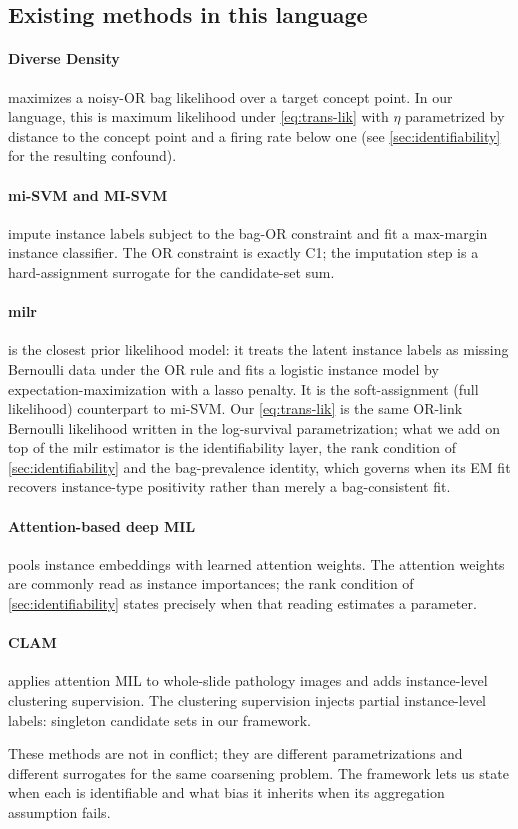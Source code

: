 \subsection{Existing methods in this language}

\paragraph{Diverse Density \citep{maron1998framework}} maximizes a
noisy-OR bag likelihood over a target concept point. In our
language, this is maximum likelihood under \eqref{eq:trans-lik}
with $\eta$ parametrized by distance to the concept point and a
firing rate below one (see \cref{sec:identifiability} for the
resulting confound).

\paragraph{mi-SVM and MI-SVM \citep{andrews2003support}} impute
instance labels subject to the bag-OR constraint and fit a
max-margin instance classifier. The OR constraint is exactly C1;
the imputation step is a hard-assignment surrogate for the
candidate-set sum.

\paragraph{milr \citep{chen2017milr}} is the closest prior
likelihood model: it treats the latent instance labels as missing
Bernoulli data under the OR rule and fits a logistic instance model
by expectation-maximization with a lasso penalty. It is the
soft-assignment (full likelihood) counterpart to mi-SVM. Our
\eqref{eq:trans-lik} is the same OR-link Bernoulli likelihood written
in the log-survival parametrization; what we add on top of the milr
estimator is the identifiability layer, the rank condition of
\cref{sec:identifiability} and the bag-prevalence identity, which
governs when its EM fit recovers instance-type positivity rather than
merely a bag-consistent fit.

\paragraph{Attention-based deep MIL \citep{ilse2018attention}} pools
instance embeddings with learned attention weights. The attention
weights are commonly read as instance importances; the rank
condition of \cref{sec:identifiability} states precisely when that
reading estimates a parameter.

\paragraph{CLAM \citep{lu2021data}} applies attention MIL to
whole-slide pathology images and adds instance-level clustering
supervision. The clustering supervision injects partial
instance-level labels: singleton candidate sets in our framework.

These methods are not in conflict; they are different
parametrizations and different surrogates for the same coarsening
problem. The framework lets us state when each is identifiable and
what bias it inherits when its aggregation assumption fails.
